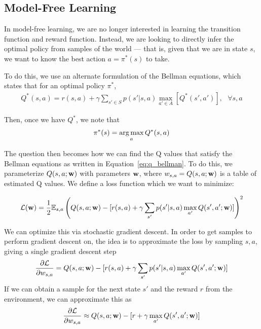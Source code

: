 \documentclass[12pt]{article}
\begin{document}
\vspace{.5pc}




\subsection{Model-Free Learning}

In model-free learning, we are no longer interested in learning the transition function and reward function. Instead, we are looking to directly infer the optimal policy from samples of the world --- that is, given that we are in state $s$, we want to know the best action $a = \pi^*(s)$ to take.

To do this, we use an alternate formulation of the Bellman equations, which states that for an optimal policy $\pi^*$,
\begin{align}
Q^*(s,a) = r(s,a) + \gamma\sum_{s' \in S}p(s' | s, a)\max_{a' \in A}[Q^*(s', a')], \text{  } \forall s,a \label{eq:q_bellman}
\end{align}

Then, once we have $Q^*$, we note that
\begin{align}
\pi^*(s) = \argmax_aQ^*(s, a)
\end{align}

The question then becomes how we can find the Q values that satisfy the Bellman equations as written in Equation~\ref{eq:q_bellman}. To do this, we parameterize $Q(s,a; \mathbf{w})$ with parameters $\mathbf{w}$, where $w_{s,a} = Q(s,a;\mathbf{w})$ is a table of estimated Q values. We define a loss function which we want to minimize:

\begin{align}
\mathcal{L}(\mathbf{w}) = \frac{1}{2}\mathbb{E}_{s,a}\left( Q(s,a; \mathbf{w}) - [r(s,a) + \gamma\sum_{s'}p(s'|s, a)\max_{a'}Q(s', a'; \mathbf{w})
]\right)^2
\end{align}

We can optimize this via stochastic gradient descent. In order to get samples to perform gradient descent on, the idea is to approximate the loss by sampling $s,a$, giving a single gradient descent step
\begin{align}\frac{\partial \mathcal{L}}{\partial w_{s,a}} = Q(s,a;\mathbf{w}) - [r(s,a) + \gamma \sum_{s'}p(s'|s, a)\max_{a'}Q(s', a'; \mathbf{w})]\end{align}
If we can obtain a sample for the next state $s'$ and the reward $r$ from the environment, we can approximate this as
\begin{align}\frac{\partial \mathcal{L}}{\partial w_{s,a}} \approx Q(s,a;\mathbf{w}) - [r + \gamma \max_{a'}Q(s', a'; \mathbf{w})]\end{align}
\end{document}
